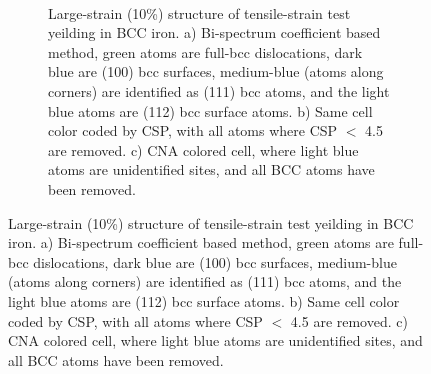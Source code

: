 \documentclass[12pt]{iopart}
\begin{document}
\begin{figure}[htbp]
\begin{figure}
\begin{center}
 \\
\caption{Large-strain (10\%) structure of tensile-strain test yeilding in BCC iron. a) Bi-spectrum coefficient based method, green atoms are full-bcc dislocations, dark blue are (100) bcc surfaces, medium-blue (atoms along corners) are identified as (111) bcc atoms, and the light blue atoms are (112) bcc surface atoms. b) Same cell color coded by CSP, with all atoms where CSP $<$ 4.5 are removed. c) CNA colored cell, where light blue atoms are unidentified sites, and all BCC atoms have been removed.}
\label{fig:bcc_strain_structures}
\end{center}
\end{figure}


\end{figure}
\end{document}
